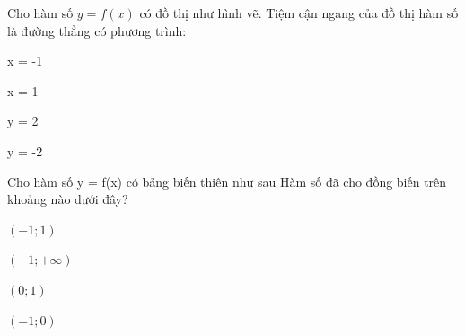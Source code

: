 \begin{question}[type=multiple_choice,difficulty=1,code={I-1}]
Cho hàm số $y = f(x)$ có đồ thị như hình vẽ. Tiệm cận ngang của đồ thị hàm số là đường thẳng có phương trình:



\begin{choice}[label=A]
x = -1
\end{choice}

\begin{choice}[label=B]
x = 1
\end{choice}

\begin{choice}[correct,label=C]
y = 2
\end{choice}

\begin{choice}[label=D]
y = -2
\end{choice}

\end{question}

\begin{question}[type=multiple_choice,difficulty=1,code={I-2}]
Cho hàm số y = f(x) có bảng biến thiên như sau
Hàm số đã cho đồng biến trên khoảng nào dưới đây?



\begin{choice}[label=A]
$ (-1;1) $
\end{choice}

\begin{choice}[label=B]
$ (-1;+\infty) $
\end{choice}

\begin{choice}[correct,label=C]
$ (0;1) $
\end{choice}

\begin{choice}[label=D]
$ (-1;0) $
\end{choice}

\end{question}

